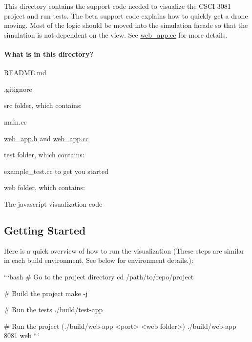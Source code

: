 This directory contains the support code needed to visualize the C\+S\+CI 3081 project and run tests. The beta support code explains how to quickly get a drone moving. Most of the logic should be moved into the simulation facade so that the simulation is not dependent on the view. See {\ttfamily \hyperlink{web__app_8cc}{web\+\_\+app.\+cc}} for more details.

\paragraph*{What is in this directory?}


\begin{DoxyItemize}
\item {\ttfamily R\+E\+A\+D\+M\+E.\+md} 
\item {\ttfamily .gitignore} 
\item {\ttfamily src} folder, which contains\+: 
\begin{DoxyItemize}
\item {\ttfamily main.\+cc} 
\item {\ttfamily \hyperlink{web__app_8h}{web\+\_\+app.\+h}} and {\ttfamily \hyperlink{web__app_8cc}{web\+\_\+app.\+cc}} 
\end{DoxyItemize}
\item {\ttfamily test} folder, which contains\+: 
\begin{DoxyItemize}
\item {\ttfamily example\+\_\+test.\+cc} to get you started 
\end{DoxyItemize}
\item {\ttfamily web} folder, which contains\+: 
\begin{DoxyItemize}
\item The javascript visualization code 
\end{DoxyItemize}
\end{DoxyItemize}

\subsection*{Getting Started}

Here is a quick overview of how to run the visualization (These steps are similar in each build environment. See below for environment details.)\+: \begin{DoxyVerb}```bash
# Go to the project directory
cd /path/to/repo/project

# Build the project
make -j

# Run the tests
./build/test-app

# Run the project (./build/web-app <port> <web folder>)
./build/web-app 8081 web
```
\end{DoxyVerb}


